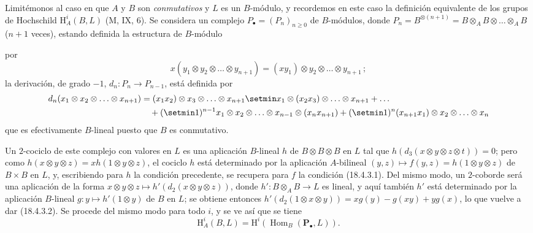 \begin{env}[18.4.4]
\label{0.18.4.4-es}
Limitémonos al caso en que $A$ y $B$ son \emph{conmutativos} y $L$ es un
$B$-módulo, y recordemos en este caso la definición equivalente de los grupos
de Hochschild $\mathrm H_A^i(B,L)$ (M, IX, 6). Se considera un complejo
$P_\bullet=(P_n)_{n\geqslant0}$ de $B$-módulos, donde
$P_n=B^{\otimes(n+1)}=B\otimes_A B\otimes\ldots\otimes_A B$
($n+1$ veces), estando definida la estructura de $B$-módulo


por
\[
  x(y_1\otimes y_2\otimes\ldots\otimes y_{n+1})
  =(xy_1)\otimes y_2\otimes\ldots\otimes y_{n+1}\,;
\]
la derivación, de grado $-1$, $d_n:P_n\to P_{n-1}$, está
definida por
\begin{align*}
  d_n(x_1\otimes x_2\otimes\ldots\otimes x_{n+1})
    &=(x_1x_2)\otimes x_3\otimes\ldots\otimes x_{n+1}
      \setmin x_1\otimes(x_2x_3)\otimes\ldots\otimes x_{n+1}+\ldots\\
    &\quad+(\setmin 1)^{n-1}x_1\otimes x_2\otimes\ldots\otimes x_{n-1}
      \otimes(x_nx_{n+1})
      +(\setmin 1)^n(x_{n+1}x_1)\otimes x_2\otimes\ldots\otimes x_n
\end{align*}
que es efectivamente $B$-lineal puesto que $B$ es conmutativo.

Un $2$-cociclo de este complejo con valores en $L$ es una aplicación
$B$-lineal $h$ de $B\otimes B\otimes B$ en $L$ tal que
$h(d_3(x\otimes y\otimes z\otimes t))=0$; pero como
$h(x\otimes y\otimes z)=xh(1\otimes y\otimes z)$, el cociclo $h$ está
determinado por la aplicación $A$-bilineal
$(y,z)\longmapsto f(y,z)=h(1\otimes y\otimes z)$ de $B\times B$ en $L$, y,
escribiendo para $h$ la condición precedente, se recupera para $f$ la
condición (18.4.3.1). Del mismo modo, un $2$-coborde será una aplicación de la
forma $x\otimes y\otimes z\longmapsto h'(d_2(x\otimes y\otimes z))$, donde
$h':B\otimes_A B\to L$ es lineal, y aquí también $h'$ está determinado por la
aplicación $B$-lineal $g:y\longmapsto h'(1\otimes y)$ de $B$ en $L$; se
obtiene entonces
$h'(d_2(1\otimes x\otimes y))=xg(y)-g(xy)+yg(x)$, lo que vuelve a dar
(18.4.3.2). Se procede del mismo modo para todo $i$, y se ve así que se tiene
\begin{equation}
\label{0.18.4.4.1-es}
\tag{18.4.4.1}
  \mathrm H_A^i(B,L)=\mathrm H^i(\operatorname{Hom}_B(\mathbf P_\bullet,L)).
\end{equation}
\end{env}


